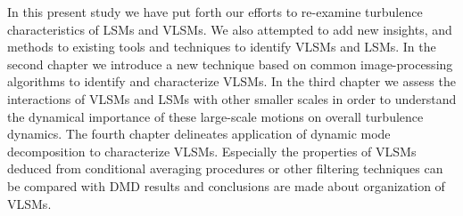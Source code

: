 In this present study we have put forth our efforts to re-examine turbulence characteristics of LSMs and VLSMs. We also attempted to add new insights, and methods to existing tools and techniques to identify VLSMs and LSMs. In the second chapter we introduce a new technique based on common image-processing algorithms to identify and characterize VLSMs. In the third chapter we assess the interactions of VLSMs and LSMs with other smaller scales in order to understand the dynamical importance of these large-scale motions on overall turbulence dynamics. The fourth chapter delineates application of dynamic mode decomposition to characterize VLSMs. Especially the properties of VLSMs deduced from conditional averaging procedures or other filtering techniques can be compared with DMD results and conclusions are made about organization of VLSMs. 



\clearpage